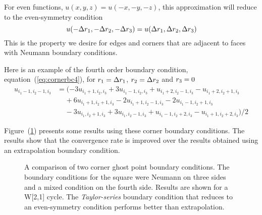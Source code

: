 For even functions, $u(x,y,z)=u(-x,-y,-z)$, this approximation will reduce to the even-symmetry 
condition
\[ 
   u(-{\Delta r_1},-{\Delta r_2},-{\Delta r_3})= u({\Delta r_1},{\Delta r_2},{\Delta r_3})
\]
This is the property we desire for edges and corners that are adjacent to faces with Neumann boundary conditions.


Here is an example of the fourth order boundary condition, equation~(\ref{eq:cornerbc4}),
 for ${r_1}={\Delta r_1}$, ${r_2}={\Delta r_2}$ and  ${r_3}=0$
\begin{align*}
u_{i_1-1,i_2-1,i_3} &=(-3u_{i_1+1,i_2,i_3}+3u_{i_1-1,i_2,i_3} +u_{i_1+2,i_2-1,i_3} -u_{i_1+2,i_2+1,i_3} \\
       &  ~~~~~ +6u_{i_1+1,i_2+1,i_3} -2u_{i_1+1,i_2-1,i_3}-2u_{i_1-1,i_2+1,i_3}  \\
       &  ~~~~~ -3u_{i_1,i_2+1,i_3}+3u_{i_1,i_2-1,i_3}
          +u_{i_1-1,i_2+2,i_3}-u_{i_1+1,i_2+2,i_3} )/2
\end{align*}

Figure~(\ref{fig:fourthOrderCornerBC}) presents some results using these corner boundary conditions.
The results show that the convergence rate is improved over the results obtained using an extrapolation
boundary condition.

{
\renewcommand{\figWidth}{7.cm}
\newcommand{\trimfig}[2]{\trimhb{#1}{#2}{.0}{.0}{.0}{.0}}
\begin{figure}[hbt]
\begin{center}
\end{center}
\caption{A comparison of two corner ghost point boundary conditions.
The boundary conditions for the square were Neumann on three sides and a mixed condition on the fourth side.
Results are shown for a W[2,1] cycle. The {\em Taylor-series} boundary condition that reduces to an
even-symmetry condition performs
better than extrapolation. }
\label{fig:fourthOrderCornerBC}
\end{figure}
}


